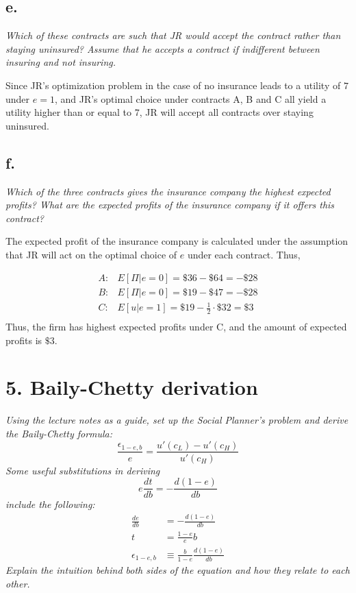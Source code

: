 \documentclass[
]{article}
\begin{document}
\hypertarget{e.-1}{%
\subsection{e.}\label{e.-1}}

\textit{Which of these contracts are such that JR would accept the contract rather than staying uninsured? Assume that he accepts a contract if indifferent between insuring and not insuring.}

Since JR's optimization problem in the case of no insurance leads to a
utility of \(7\) under \(e = 1\), and JR's optimal choice under
contracts A, B and C all yield a utility higher than or equal to \(7\),
JR will accept all contracts over staying uninsured.

\hypertarget{f.}{%
\subsection{f.~}\label{f.}}

\textit{Which of the three contracts gives the insurance company the highest expected profits? What are the expected profits of the insurance company if it offers this contract?}

The expected profit of the insurance company is calculated under the
assumption that JR will act on the optimal choice of \(e\) under each
contract. Thus,

\[\begin{aligned}
A : &E[\Pi|e=0] = \$36 - \$64 = -\$28 \\
B: &E[\Pi|e=0] = \$19 - \$47 = -\$28 \\
C: &E[u|e=1] = \$19 - \frac{1}{2}\cdot \$32 = \$3 \\
\end{aligned}\] Thus, the firm has highest expected profits under C, and
the amount of expected profits is \(\$3\).

\hypertarget{baily-chetty-derivation}{%
\section{5. Baily-Chetty derivation}\label{baily-chetty-derivation}}

\textit{Using the lecture notes as a guide, set up the Social Planner’s problem and derive the Baily-Chetty formula: \[\frac{\epsilon_{1-e,b}}{e} = \frac{u'(c_L) - u'(c_H)}{u'(c_H)}\]
Some useful substitutions in deriving 
\[e\frac{dt}{db} = -\frac{d(1-e)}{db}\] 
include the following: \[\begin{aligned} 
\frac{de}{db} &= -\frac{d(1-e)}{db} \\
t &= \frac{1-e}{e}b \\
\epsilon _{1-e, b} &\equiv \frac{b}{1-e} \frac{d(1-e)}{db}
\end{aligned}\]
Explain the intuition behind both sides of the equation and how they relate to each other.}
\end{document}
